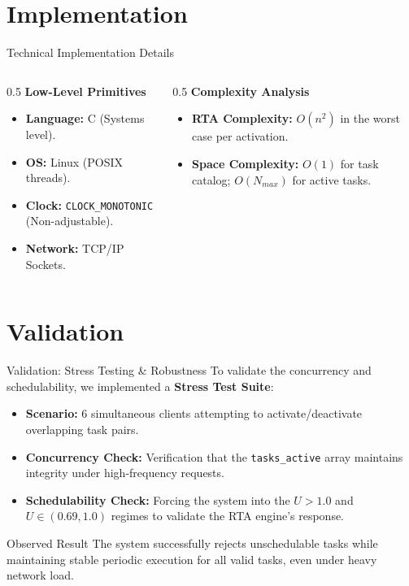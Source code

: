 \section{Implementation}
\begin{frame}{Technical Implementation Details}
    \begin{columns}
        \begin{column}{0.5\textwidth}
            \textbf{Low-Level Primitives}
            \begin{itemize}
                \item \textbf{Language:} C (Systems level).
                \item \textbf{OS:} Linux (POSIX threads).
                \item \textbf{Clock:} \texttt{CLOCK\_MONOTONIC} (Non-adjustable).
                \item \textbf{Network:} TCP/IP Sockets.
            \end{itemize}
        \end{column}
        \begin{column}{0.5\textwidth}
            \textbf{Complexity Analysis}
            \begin{itemize}
                \item \textbf{RTA Complexity:} $O(n^2)$ in the worst case per activation.
                \item \textbf{Space Complexity:} $O(1)$ for task catalog; $O(N_{max})$ for active tasks.
            \end{itemize}
        \end{column}
    \end{columns}
\end{frame}

\section{Validation}
\begin{frame}{Validation: Stress Testing \& Robustness}
    To validate the concurrency and schedulability, we implemented a \textbf{Stress Test Suite}:
    \begin{itemize}
        \item \textbf{Scenario:} 6 simultaneous clients attempting to activate/deactivate overlapping task pairs.
        \item \textbf{Concurrency Check:} Verification that the \texttt{tasks\_active} array maintains integrity under high-frequency requests.
        \item \textbf{Schedulability Check:} Forcing the system into the $U > 1.0$ and $U \in (0.69, 1.0)$ regimes to validate the RTA engine's response.
    \end{itemize}
    \begin{exampleblock}{Observed Result}
        The system successfully rejects unschedulable tasks while maintaining stable periodic execution for all valid tasks, even under heavy network load.
    \end{exampleblock}
\end{frame}

